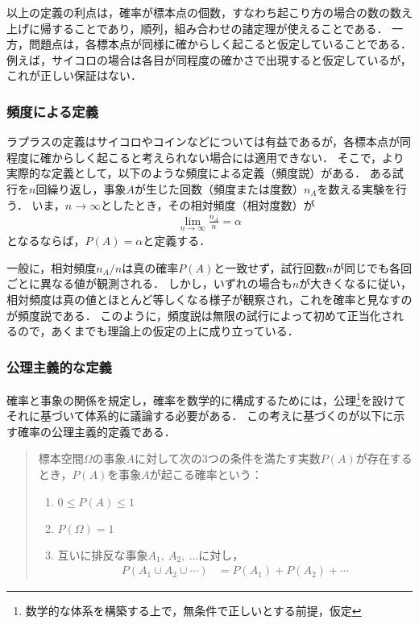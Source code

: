 %
以上の定義の利点は，確率が標本点の個数，すなわち起こり方の場合の数の数え上げに帰することであり，順列，組み合わせの諸定理が使えることである．
%
一方，問題点は，各標本点が同様に確からしく起こると仮定していることである．
%
例えば，サイコロの場合は各目が同程度の確かさで出現すると仮定しているが，これが正しい保証はない．
%

\subsubsection*{頻度による定義}
%
ラプラスの定義はサイコロやコインなどについては有益であるが，各標本点が同程度に確からしく起こると考えられない場合には適用できない．
%
そこで，より実際的な定義として，以下のような頻度による定義（頻度説）がある．
%
ある試行を$ n $回繰り返し，事象$ A $が生じた回数（頻度または度数）$ n_{A} $を数える実験を行う．
%
いま，$ n\to \infty $としたとき，その相対頻度（相対度数）が
%
\begin{align*}
	\lim_{n\to \infty} \frac{n_{A}}{n} = \alpha
\end{align*}
%
となるならば，$ P(A)=\alpha $と定義する．
%

%
一般に，相対頻度$ n_{A}/n $は真の確率$ P(A) $と一致せず，試行回数$ n $が同じでも各回ごとに異なる値が観測される．
%
しかし，いずれの場合も$ n $が大きくなるに従い，相対頻度は真の値とほとんど等しくなる様子が観察され，これを確率と見なすのが頻度説である．
%
このように，頻度説は無限の試行によって初めて正当化されるので，あくまでも理論上の仮定の上に成り立っている．
%

\subsubsection*{公理主義的な定義}
%
確率と事象の関係を規定し，確率を数学的に構成するためには，公理\footnote{数学的な体系を構築する上で，無条件で正しいとする前提，仮定}を設けてそれに基づいて体系的に議論する必要がある．
%
この考えに基づくのが以下に示す確率の公理主義的定義である．
%

%
\begin{quotation}
標本空間$ \Omega $の事象$ A $に対して次の3つの条件を満たす実数$ P(A) $が存在するとき，$ P(A) $を事象$ A $が起こる確率という：
%
\begin{enumerate}
\item
$  0 \leq P(A) \leq 1 $
\item
$ P(\Omega) = 1 $
\item
互いに排反な事象$ A_{1},\ A_{2},\ \ldots $に対し，
%
\begin{align*}
	P(A_{1} \cup A_{2} \cup \cdots) &= P(A_{1}) + P(A_{2}) + \cdots
\end{align*}
%
\end{enumerate}
%
\end{quotation}
%

